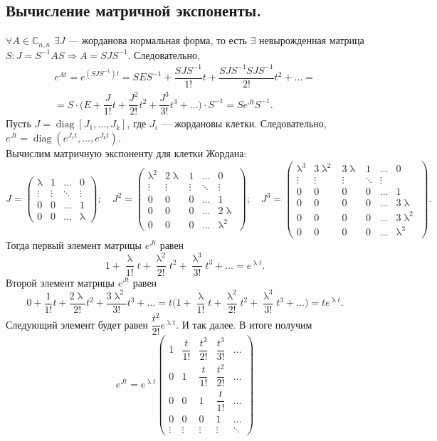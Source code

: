 \documentclass[a4paper, 12pt]{report}
\newcommand{\Cm}{\mathbb{C}}
\renewcommand{\lambda}{\uplambda}
\begin{document}
\subsection*{Вычисление матричной экспоненты.}
$\forall A \in \Cm_{n,n}$ $\exists J$ --- жорданова нормальная форма, то есть $\exists$ невырожденная матрица $S: J = S^{-1}AS \Rightarrow A = S JS^{-1}$. Следовательно, \begin{multline*}
	e^{At} = e^{(SJS^{-1})t} = SES^{-1} + \dfrac{SJS^{-1}}{1!}t + \dfrac{SJS^{-1}SJS^{-1}}{2!}t^2 + \ldots =\\= S\cdot \Big(E + \dfrac{J}{1!}t + \dfrac{J^2}{2!}t^2 + \dfrac{J^3}{3!}t^3 + \ldots\Big)\cdot S^{-1} = Se^{Jt}S^{-1}.
\end{multline*}
Пусть $J = \operatorname{diag}[J_1,\ldots,J_k]$, где $J_i$ --- жордановы клетки. Следовательно, $e^{Jt} = \operatorname{diag}(e^{J_1t},\ldots,e^{J_kt})$.\\
Вычислим матричную экспоненту для клетки Жордана:
$$J = \begin{pmatrix}
	\lambda & 1 & \dots & 0\\
	\vdots & \vdots & \ddots & \vdots\\
	0 & 0 & \dots & 1\\
	0 & 0 & \dots & \lambda
\end{pmatrix};\quad J^2 = \begin{pmatrix}
\lambda^2 & 2\lambda & 1 & \dots & 0\\
\vdots & \vdots & \vdots & \ddots & \vdots\\
0 & 0 & 0 & \dots & 1\\
0 & 0 & 0 & \dots & 2\lambda\\
0 & 0 & 0 & \dots & \lambda^2
\end{pmatrix};\quad J^3 = \begin{pmatrix}
\lambda^3 & 3\lambda^2 & 3\lambda & 1 & \dots & 0\\
\vdots & \vdots & \vdots & \ddots & \vdots\\
0 & 0 & 0 & 0 & \dots & 1\\
0 & 0 & 0 & 0 & \dots & 3\lambda\\
0 & 0 & 0 & 0 & \dots & 3\lambda^2\\
0 & 0 & 0 & 0 & \dots & \lambda^3
\end{pmatrix}.$$
Тогда первый элемент матрицы $e^{Jt}$ равен $$1 + \dfrac{\lambda}{1!}t + \dfrac{\lambda^2}{2!}t^2 + \dfrac{\lambda^3}{3!}t^3 + \ldots = e^{\lambda t}.$$
Второй элемент матрицы $e^{Jt}$ равен $$0 + \dfrac{1}{1!}t + \dfrac{2\lambda}{2!}t^2 + \dfrac{3\lambda^2}{3!}t^3 + \ldots  = t \Big(1 + \dfrac{\lambda}{1!}t + \dfrac{\lambda^2}{2!}t^2 + \dfrac{\lambda^3}{3!}t^3 + \ldots\Big)= te^{\lambda t}.$$
Следующий элемент будет равен $\dfrac{t^2}{2!}e^{\lambda t}$. И так далее. В итоге получим
$$e^{Jt} = e^{\lambda t}\begin{pmatrix}
	1 & \dfrac{t}{1!} & \dfrac{t^2}{2!} & \dfrac{t^3}{3!} & \dots\\
	0 & 1 & \dfrac{t}{1!} & \dfrac{t^2}{2!} & \dots\\
	0 & 0 & 1 & \dfrac{t}{1!} & \dots\\
	0 & 0 & 0 & 1 & \dots\\
	\vdots & \vdots & \vdots & \vdots & \ddots
\end{pmatrix}$$
\end{document}
